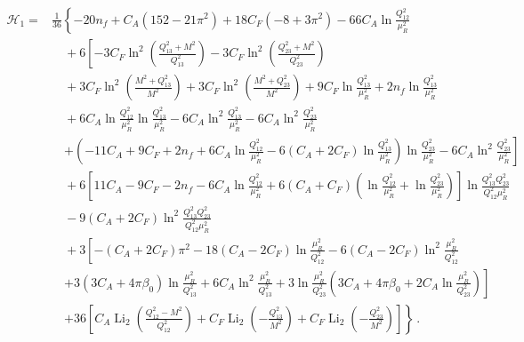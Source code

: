 \begin{equation}
\begin{aligned}
\mathcal{H}_1=&\frac{1}{36}\left\{-20n_f+C_A(152-21\pi^2)+18C_F(-8+3\pi^2)
-66C_A\ln\frac{Q_{12}^2}{\mu_R^2}\right.\\[1ex]
&\quad+6\left[-3C_F\ln^2\left(\frac{Q_{13}^2+M^2}{Q_{13}^2}\right)-3C_F\ln^2\left(\frac{Q_{23}^2+M^2}{Q_{23}^2}\right)\right.\\
&\quad+3C_F\ln^2\left(\frac{M^2+Q_{13}^2}{M^2}\right)+3C_F\ln^2\left(\frac{M^2+Q_{23}^2}{M^2}\right)
+9C_F\ln\frac{Q_{13}^2}{\mu_R^2}+2n_f\ln\frac{Q_{13}^2}{\mu_R^2}\\
&\quad+6C_A\ln\frac{Q_{12}^2}{\mu_R^2}\ln\frac{Q_{13}^2}{\mu_R^2}
-6C_A\ln^2\frac{Q_{13}^2}{\mu_R^2}-6C_A\ln^2\frac{Q_{23}^2}{\mu_R^2}\\
&\quad\left.+\left(-11C_A+9C_F+2n_f+6C_A\ln\frac{Q_{12}^2}{\mu_R^2}
-6(C_A+2C_F)\ln\frac{Q_{13}^2}{\mu_R^2}\right)\ln\frac{Q_{23}^2}{\mu_R^2}-6C_A\ln^2\frac{Q_{23}^2}{\mu_R^2}\right]\\[1ex]
&\quad+6\left[11C_A-9C_F-2n_f-6C_A\ln\frac{Q_{12}^2}{\mu_R^2}
+6(C_A+C_F)\left(\ln\frac{Q_{12}^2}{\mu_R^2}+\ln\frac{Q_{23}^2}{\mu_R^2}\right)\right]
\ln\frac{Q_{13}^2Q_{23}^2}{Q_{12}^2\mu_R^2}\\[1ex]
&\quad-9(C_A+2C_F)\ln^2\frac{Q_{13}^2Q_{23}^2}{Q_{12}^2\mu_R^2}\\[1ex]
&\quad+3\left[-(C_A+2C_F)\pi^2-18(C_A-2C_F)\ln\frac{\mu_R^2}{Q_{12}^2}
-6(C_A-2C_F)\ln^2\frac{\mu_R^2}{Q_{12}^2}\right.\\
&\quad\left.+3(3C_A+4\pi\beta_0)\ln\frac{\mu_R^2}{Q_{13}^2}
+6C_A\ln^2\frac{\mu_R^2}{Q_{13}^2}+3\ln\frac{\mu_R^2}{Q_{23}^2}\left(3C_A+4\pi\beta_0
+2C_A\ln\frac{\mu_R^2}{Q_{23}^2}\right)\right]\\[1ex]
&\quad\left.+36\left[C_A\operatorname{Li}_2\left(\frac{Q_{12}^2-M^2}{Q_{12}^2}\right)
+C_F\operatorname{Li}_2\left(-\frac{Q_{13}^2}{M^2}\right)
+C_F\operatorname{Li}_2\left(-\frac{Q_{23}^2}{M^2}\right)\right]\right\}\,.
\end{aligned}
\end{equation}



